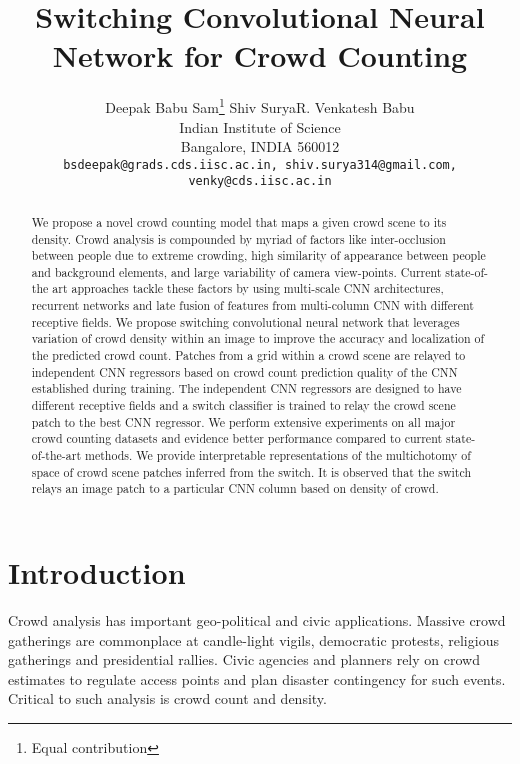 \documentclass[10pt,twocolumn,letterpaper]{article}
\begin{document}
\title{Switching Convolutional Neural Network for Crowd Counting}

\author{Deepak Babu Sam\thanks{Equal contribution}  \qquad Shiv Surya\footnotemark[1] \qquad R. Venkatesh Babu \\ Indian Institute of Science\\
 Bangalore, INDIA 560012 \\ {\tt\small bsdeepak@grads.cds.iisc.ac.in, shiv.surya314@gmail.com, venky@cds.iisc.ac.in}}

\maketitle
\begin{abstract}

We propose a novel crowd counting model that maps a given crowd scene to its density. Crowd analysis is compounded by myriad of factors like inter-occlusion between people due to extreme crowding, high similarity of appearance between people and background elements, and large variability of camera view-points. Current state-of-the art approaches tackle these factors by using multi-scale CNN architectures, recurrent networks and late fusion of features from multi-column CNN with different receptive fields. We propose switching convolutional neural network that leverages variation of crowd density within an image to improve the accuracy and localization of the predicted crowd count. Patches from a grid within a crowd scene are relayed to independent CNN regressors based on crowd count prediction quality of the CNN established during training. The independent CNN regressors are designed to have different receptive fields and a switch classifier is trained to relay the crowd scene patch to the best CNN regressor. We perform extensive experiments on all major crowd counting datasets and evidence better performance compared to current state-of-the-art methods. We  provide interpretable representations of the multichotomy of space of crowd scene patches inferred from the switch. It is observed that the switch relays an image patch to a particular CNN column based on density of crowd. 



\end{abstract}


\section{Introduction}
Crowd analysis has important geo-political and civic applications. Massive crowd gatherings are commonplace at candle-light vigils, democratic protests, religious gatherings and presidential rallies. Civic agencies and planners rely on crowd estimates to regulate access points and plan disaster contingency for such events. Critical to such analysis is crowd count and density. 
\end{document}
